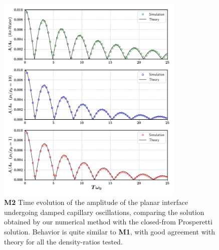 \begin{figure}[h!]
    \centering
    \includegraphics[width = 0.8\textwidth]{plots/capwave/compare_daniel.png}
	\caption{\textbf{M2} Time evolution of the amplitude of the planar interface undergoing damped capillary oscillations, comparing the solution obtained by our numerical method with the closed-from Prosperetti solution. Behavior is quite similar to \textbf{M1}, with good agreement with theory for all the density-ratios tested. }
    \label{capwave_daniel}
\end{figure}

